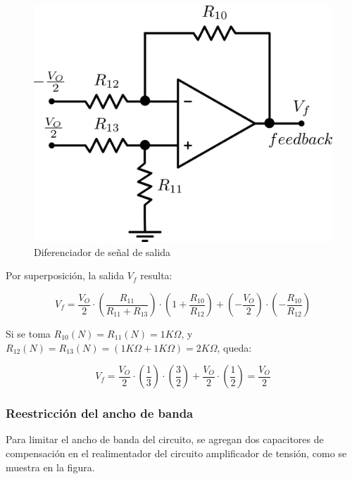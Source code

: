 \begin{figure}[!ht]
\begin{centering}
\includegraphics[scale=0.5]{Imagenes/Diferenciador.png}
\par\end{centering}
\caption{Diferenciador de señal de salida}
\end{figure}

Por superposición, la salida $V_f$ resulta:

\[
V_f = \frac{V_O}{2} \cdot \left( \frac{R_{11}}{R_{11} + R_{13}} \right) \cdot \left( 1 + \frac{R_{10}}{R_{12}} \right) + \left( -\frac{V_O}{2} \right) \cdot \left( -\frac{R_{10}}{R_{12}} \right)
\]

Si se toma $R_{10}(N) = R_{11}(N) = 1K\Omega$, y $R_{12}(N) = R_{13}(N) = (1K\Omega + 1K\Omega) = 2K\Omega$, queda:

\[
V_f = \frac{V_O}{2} \cdot \left( \frac{1}{3} \right) \cdot \left( \frac{3}{2} \right) + \frac{V_O}{2} \cdot \left( \frac{1}{2} \right) = \frac{V_O}{2}
\]

\subsubsection{Reestricción del ancho de banda}

Para limitar el ancho de banda del circuito, se agregan dos capacitores de compensación en el realimentador del circuito amplificador de tensión, como se muestra en la figura.

